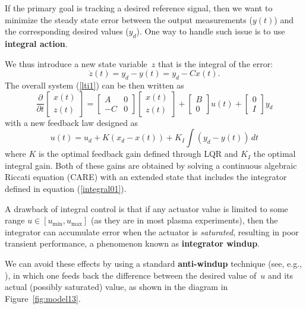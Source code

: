 \documentclass[12pt,lot, lof]{puthesis}
\begin{document}
If the primary goal is tracking a desired reference signal, then we want to minimize the steady state error between the output measurements ($y(t)$) and the corresponding desired values ($y_d$). One way to handle such issue is to use \textbf{integral action}.

We thus introduce a new state variable~$z$ that is the integral of the error:
\begin{equation}
	\dot{z}(t) = y_{d} - y(t) = y_{d} - C x(t).
	\label{integral01}
\end{equation}
The overall system (\ref{lti1}) can be then written as
\begin{equation}
\renewcommand\arraystretch{0.8}
\frac{\partial}{\partial t} \begin{bmatrix}  x(t) \\ z(t) \end{bmatrix}
  = { \begin{bmatrix} A  & 0 \\ -C & 0 \end{bmatrix} } \begin{bmatrix} x(t) \\ z(t) \end{bmatrix}
  + \begin{bmatrix} B \\ 0 \end{bmatrix} u(t) + \begin{bmatrix} 0 \\ I \end{bmatrix} y_{d}
\label{integral02}
\end{equation}
with a new feedback law designed as
\begin{equation}
u(t)  = u_d + K (x_d - x(t)) + K_I \!\!\int (y_d - y(t)) \, dt
\end{equation}
where $K$ is the optimal feedback gain defined through LQR and $K_I$  the optimal integral gain. Both of these gains are obtained by solving a continuous algebraic Riccati equation (CARE) with an extended state that includes the integrator defined in equation (\ref{integral01}).

A drawback of integral control is that if any actuator value is limited to some range $u\in[u_\text{min},u_\text{max}]$ (as they are in most plasma experiments), then the integrator can accumulate error when the actuator is \emph{saturated}, resulting in poor transient performance, a phenomenon known as \textbf{integrator windup}.  

We can avoid these effects by using a standard \textbf{anti-windup} technique (see, e.g., \cite{AandM, Lewis}), in which one feeds back the difference between the desired value of~$u$ and its actual (possibly saturated) value, as shown in the diagram in Figure~\ref{fig:model13}.  
\end{document}
